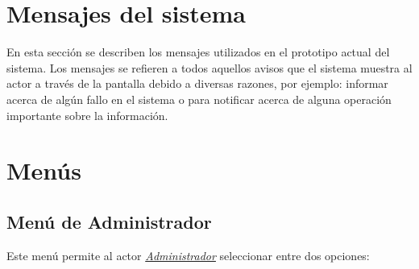 \section{Mensajes del sistema}

En esta sección se describen los mensajes utilizados en el prototipo actual del sistema. Los mensajes
se refieren a todos aquellos avisos que el sistema muestra al actor a través de la pantalla debido a diversas razones, por ejemplo: informar acerca de algún fallo en el sistema o para notificar acerca de alguna operación importante sobre la información.































\section{Menús}

\subsection{Menú de Administrador}
 
 Este menú permite al actor {\em {\hyperlink{admin}{Administrador}}} seleccionar entre dos opciones:
 
